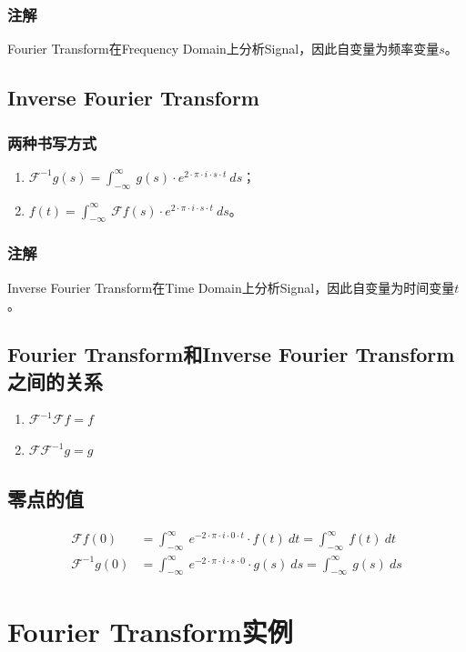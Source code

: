 \subsubsection{注解}
Fourier Transform在Frequency Domain上分析Signal，因此自变量为频率变量$s$。
\subsection{Inverse Fourier Transform}
\subsubsection{两种书写方式}
\begin{enumerate}
	\item $\mathcal{F}^{-1}g(s)=\int_{-\infty}^{\infty}\ g(s)\cdot e^{2\cdot \pi\cdot i\cdot s\cdot t}\ ds$；
	\item $f(t)=\int_{-\infty}^{\infty}\ \mathcal{F}f(s)\cdot e^{2\cdot \pi\cdot i\cdot s\cdot t}\ ds$。
\end{enumerate}
\subsubsection{注解}
Inverse Fourier Transform在Time Domain上分析Signal，因此自变量为时间变量$t$。
\subsection{Fourier Transform和Inverse Fourier Transform之间的关系}
\begin{enumerate}
	\item $\mathcal{F}^{-1}\mathcal{F}f=f$
	\item $\mathcal{F}\mathcal{F}^{-1}g=g$
\end{enumerate}
\subsection{零点的值}
\begin{align*}
	\mathcal{F}f(0)      & =\int_{-\infty}^{\infty}\ e^{-2\cdot \pi\cdot i\cdot 0\cdot t}\cdot f(t)\ dt=\int_{-\infty}^{\infty}\ f(t)\ dt \\
	\mathcal{F}^{-1}g(0) & =\int_{-\infty}^{\infty}\ e^{-2\cdot \pi\cdot i\cdot s\cdot 0}\cdot g(s)\ ds=\int_{-\infty}^{\infty}\ g(s)\ ds
\end{align*}
\section{Fourier Transform实例}
